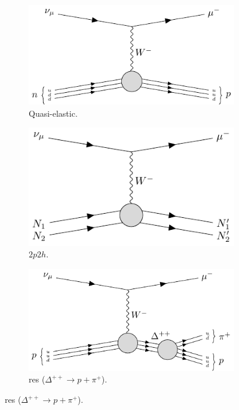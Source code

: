 \begin{figure}[t]
	\begin{subfigure}{0.5\textwidth}
		\centering
		\includegraphics[width=.90\linewidth]{Images/Nu/feynman_ccqel.pdf}
		\caption{Quasi-elastic.}
	\end{subfigure}
	\begin{subfigure}{0.5\textwidth}
		\centering
		\includegraphics[width=.90\linewidth]{Images//Nu/feynman_ccmec.pdf}
		\caption{$2p2h$.}
	\end{subfigure}
	\begin{subfigure}{0.5\textwidth}
		\centering
		\includegraphics[width=.90\linewidth]{Images//Nu/feynman_ccres_delta++.pdf}
		\caption{\gls{res} ($\Delta^{++} \rightarrow p + \pi^{+}$).}
	\end{subfigure}

\end{figure}
